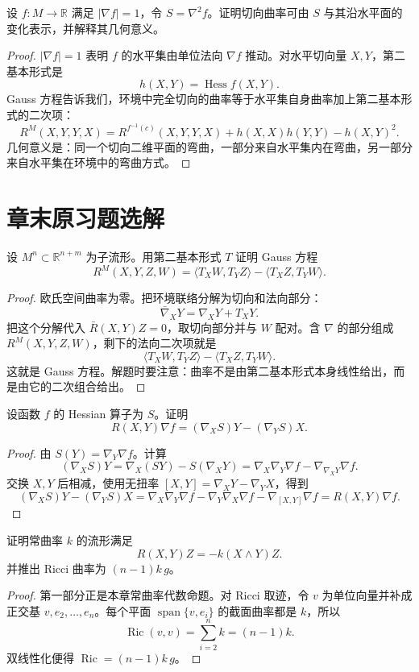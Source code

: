 \documentclass[11pt,a4paper,openany]{ctexbook}
\numberwithin{equation}{chapter}
\begin{document}
\begin{problem}
设 \(f\colon M\to\mathbb R\) 满足 \(|\nabla f|=1\)，令 \(S=\nabla^2 f\)。证明切向曲率可由 \(S\) 与其沿水平面的变化表示，并解释其几何意义。
\end{problem}
\begin{proof}
\(|\nabla f|=1\) 表明 \(f\) 的水平集由单位法向 \(\nabla f\) 推动。对水平切向量 \(X,Y\)，第二基本形式是
\[
h(X,Y)=\operatorname{Hess}f(X,Y).
\]
Gauss 方程告诉我们，环境中完全切向的曲率等于水平集自身曲率加上第二基本形式的二次项：
\[
R^M(X,Y,Y,X)=R^{f^{-1}(c)}(X,Y,Y,X)+h(X,X)h(Y,Y)-h(X,Y)^2.
\]
几何意义是：同一个切向二维平面的弯曲，一部分来自水平集内在弯曲，另一部分来自水平集在环境中的弯曲方式。
\end{proof}

\section{章末原习题选解}

\begin{problem}
设 \(M^n\subset\mathbb R^{n+m}\) 为子流形。用第二基本形式 \(T\) 证明 Gauss 方程
\[
R^M(X,Y,Z,W)=\langle T_XW,T_YZ\rangle-\langle T_XZ,T_YW\rangle.
\]
\end{problem}
\begin{proof}
欧氏空间曲率为零。把环境联络分解为切向和法向部分：
\[
\bar\nabla_XY=\nabla_XY+T_XY.
\]
把这个分解代入 \(\bar R(X,Y)Z=0\)，取切向部分并与 \(W\) 配对。含 \(\nabla\) 的部分组成 \(R^M(X,Y,Z,W)\)，剩下的法向二次项就是
\[
\langle T_XW,T_YZ\rangle-\langle T_XZ,T_YW\rangle.
\]
这就是 Gauss 方程。解题时要注意：曲率不是由第二基本形式本身线性给出，而是由它的二次组合给出。
\end{proof}

\begin{problem}
设函数 \(f\) 的 Hessian 算子为 \(S\)。证明
\[
R(X,Y)\nabla f=(\nabla_XS)Y-(\nabla_YS)X.
\]
\end{problem}
\begin{proof}
由 \(S(Y)=\nabla_Y\nabla f\)。计算
\[
(\nabla_XS)Y=\nabla_X(SY)-S(\nabla_XY)
=\nabla_X\nabla_Y\nabla f-\nabla_{\nabla_XY}\nabla f.
\]
交换 \(X,Y\) 后相减，使用无扭率 \([X,Y]=\nabla_XY-\nabla_YX\)，得到
\[
(\nabla_XS)Y-(\nabla_YS)X
=\nabla_X\nabla_Y\nabla f-\nabla_Y\nabla_X\nabla f-\nabla_{[X,Y]}\nabla f
=R(X,Y)\nabla f.
\]
\end{proof}

\begin{problem}
证明常曲率 \(k\) 的流形满足
\[
R(X,Y)Z=-k(X\wedge Y)Z.
\]
并推出 Ricci 曲率为 \((n-1)k\,g\)。
\end{problem}
\begin{proof}
第一部分正是本章常曲率代数命题。对 Ricci 取迹，令 \(v\) 为单位向量并补成正交基 \(v,e_2,\ldots,e_n\)。每个平面 \(\operatorname{span}\{v,e_i\}\) 的截面曲率都是 \(k\)，所以
\[
\operatorname{Ric}(v,v)=\sum_{i=2}^n k=(n-1)k.
\]
双线性化便得 \(\operatorname{Ric}=(n-1)k\,g\)。
\end{proof}
\end{document}
